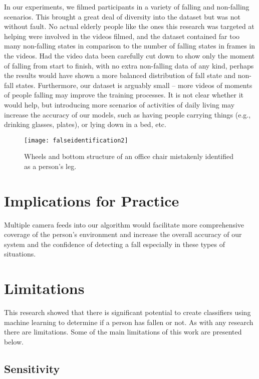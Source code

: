 In our experiments, we filmed participants in a variety of falling and non-falling scenarios. This brought a great deal of diversity into the dataset but was not without fault. No actual elderly people like the ones this research was targeted at helping were involved in the videos filmed, and the dataset contained far too many non-falling states in comparison to the number of falling states in frames in the videos. Had the video data been carefully cut down to show only the moment of falling from start to finish, with no extra non-falling data of any kind, perhaps the results would have shown a more balanced distribution of fall state and non-fall states. Furthermore, our dataset is arguably small – more videos of moments of people falling may improve the training processes. It is not clear whether it would help, but introducing more scenarios of activities of daily living may increase the accuracy of our models, such as having people carrying things (e.g., drinking glasses, plates), or lying down in a bed, etc.

\begin{figure}
  \texttt{[image: falseidentification2]}
  \caption{Wheels and bottom structure of an office chair mistakenly identified as a person’s leg.}
  \label{fig:falseidentification2}
\end{figure}



\section{Implications for Practice}

Multiple camera feeds into our algorithm would facilitate more comprehensive coverage of the person’s environment and increase the overall accuracy of our system and the confidence of detecting a fall especially in these types of situations.

\section{Limitations}

This research showed that there is significant potential to create classifiers using machine learning to determine if a person has fallen or not. As with any research there are limitations. Some of the main limitations of this work are presented below.

\subsection{Sensitivity}

